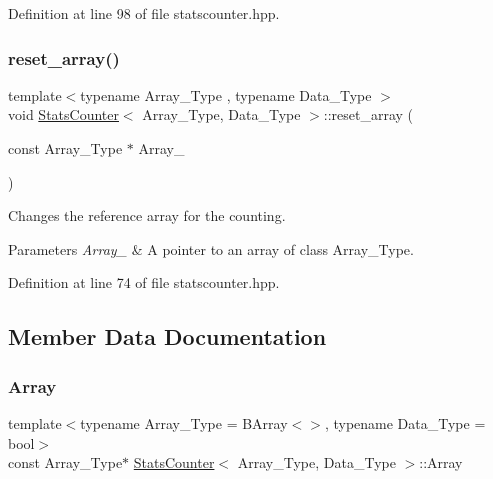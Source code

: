 Definition at line 98 of file statscounter.\+hpp.

\mbox{\label{class_stats_counter_a8dabc3a7a9931acbb76900a67d728f70}} 
\subsubsection{\texorpdfstring{reset\+\_\+array()}{reset\_array()}}
{\footnotesize\ttfamily template$<$typename Array\+\_\+\+Type , typename Data\+\_\+\+Type $>$ \\
void \hyperlink{class_stats_counter}{Stats\+Counter}$<$ Array\+\_\+\+Type, Data\+\_\+\+Type $>$\+::reset\+\_\+array (\begin{DoxyParamCaption}\item[{const Array\+\_\+\+Type $\ast$}]{Array\+\_\+ }\end{DoxyParamCaption})\hspace{0.3cm}{\ttfamily [inline]}}



Changes the reference array for the counting. 


\begin{DoxyParams}{Parameters}
{\em Array\+\_\+} & A pointer to an array of class {\ttfamily Array\+\_\+\+Type}. \\
\hline
\end{DoxyParams}


Definition at line 74 of file statscounter.\+hpp.



\subsection{Member Data Documentation}
\mbox{\label{class_stats_counter_aa826cd748cd3b1a57cbec52424285485}} 
\subsubsection{\texorpdfstring{Array}{Array}}
{\footnotesize\ttfamily template$<$typename Array\+\_\+\+Type  = B\+Array$<$$>$, typename Data\+\_\+\+Type  = bool$>$ \\
const Array\+\_\+\+Type$\ast$ \hyperlink{class_stats_counter}{Stats\+Counter}$<$ Array\+\_\+\+Type, Data\+\_\+\+Type $>$\+::Array}



